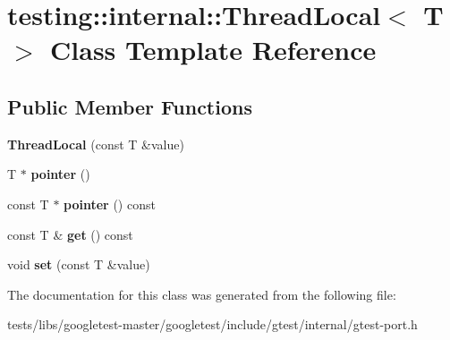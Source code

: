 \hypertarget{classtesting_1_1internal_1_1ThreadLocal}{}\section{testing\+:\+:internal\+:\+:Thread\+Local$<$ T $>$ Class Template Reference}
\label{classtesting_1_1internal_1_1ThreadLocal}
\subsection*{Public Member Functions}
\begin{DoxyCompactItemize}
\item 
\mbox{\label{classtesting_1_1internal_1_1ThreadLocal_a85610bdfdbc93a4c56215e0aad7da870}} 
{\bfseries Thread\+Local} (const T \&value)
\item 
\mbox{\label{classtesting_1_1internal_1_1ThreadLocal_a882f57fed4b074de83693c0c0fe62858}} 
T $\ast$ {\bfseries pointer} ()
\item 
\mbox{\label{classtesting_1_1internal_1_1ThreadLocal_a57e45bb60e3cd94abb04fa449e9f0367}} 
const T $\ast$ {\bfseries pointer} () const
\item 
\mbox{\label{classtesting_1_1internal_1_1ThreadLocal_ac56aeb97991824979bf192c63d1466f8}} 
const T \& {\bfseries get} () const
\item 
\mbox{\label{classtesting_1_1internal_1_1ThreadLocal_ab5ebc7ba07426cef7167afa2a7707eb4}} 
void {\bfseries set} (const T \&value)
\end{DoxyCompactItemize}


The documentation for this class was generated from the following file\+:\begin{DoxyCompactItemize}
\item 
tests/libs/googletest-\/master/googletest/include/gtest/internal/gtest-\/port.\+h\end{DoxyCompactItemize}

